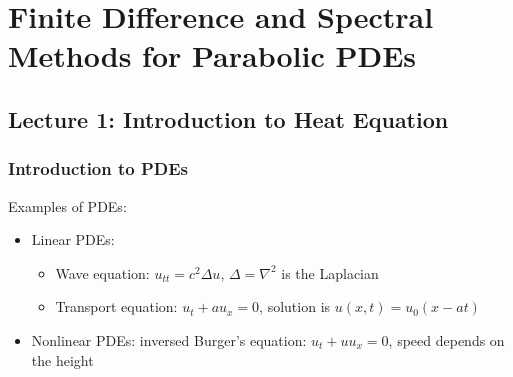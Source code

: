 \newpage
\chapter{Finite Difference and Spectral Methods for Parabolic PDEs}
\section{Lecture 1: Introduction to Heat Equation}

\subsection{Introduction to PDEs} 
Examples of PDEs: 
\begin{itemize}
    \item Linear PDEs: 
    \begin{itemize}
        \item Wave equation: $ u_{tt} = c^2 \Delta u $, $ \Delta = \nabla^2 $ is the Laplacian 
        \item Transport equation: $ u_t + a u_x =0 $, solution is $ u(x,t)=u_0(x-at) $ 
    \end{itemize}
    \item Nonlinear PDEs: inversed Burger's equation: $ u_t + uu_x =0 $, speed depends on the height  
\end{itemize}

